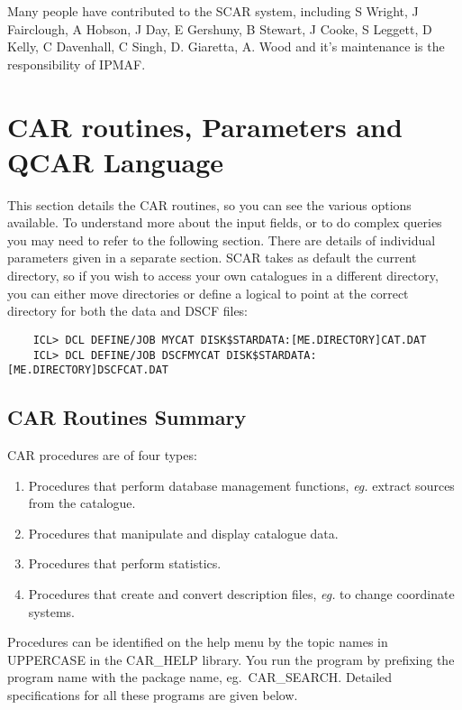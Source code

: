 Many people have contributed to the SCAR system, including S Wright, 
J Fairclough, A Hobson, J Day, E Gershuny, B Stewart, J Cooke, S Leggett, 
D Kelly, C Davenhall, C Singh, D. Giaretta, A. Wood and it's maintenance 
is the responsibility of IPMAF.


\section {CAR routines, Parameters and QCAR Language}

This section details the CAR routines, so you can see the various options
available. 
To understand more about the input fields, or to do complex queries you may 
need to refer to the following section.
There are details of individual parameters given in a separate section.
SCAR takes as default the current directory, so if you
wish to access your own catalogues in a different directory, you can either
move directories
or define a logical to point at the correct directory
for both the data and DSCF files:
\begin{verbatim}
    ICL> DCL DEFINE/JOB MYCAT DISK$STARDATA:[ME.DIRECTORY]CAT.DAT
    ICL> DCL DEFINE/JOB DSCFMYCAT DISK$STARDATA:[ME.DIRECTORY]DSCFCAT.DAT
\end{verbatim}


\subsection {CAR Routines Summary}
CAR procedures are of four types:
\begin{enumerate}
\item Procedures that perform database management functions, {\em eg.} extract 
sources from the catalogue.
\item Procedures that manipulate and display catalogue data.
\item Procedures that perform statistics.
\item Procedures that create and convert description files, {\em eg.} to change
coordinate systems.
\end{enumerate}
Procedures can be identified on the help menu by the topic names in UPPERCASE in
the CAR\_HELP library.
You run the program by prefixing the program name with the package name,
eg.\ CAR\_SEARCH.
Detailed specifications for all these programs are given below.
